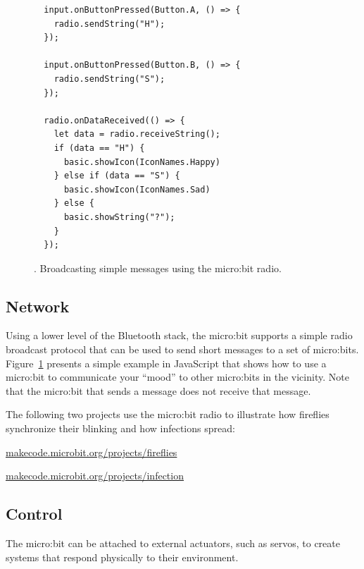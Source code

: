 \begin{figure}[t]
\begin{verbatim}
  input.onButtonPressed(Button.A, () => {
    radio.sendString("H");
  });

  input.onButtonPressed(Button.B, () => {
    radio.sendString("S");
  });

  radio.onDataReceived(() => {
    let data = radio.receiveString();
    if (data == "H") {
      basic.showIcon(IconNames.Happy)
    } else if (data == "S") {
      basic.showIcon(IconNames.Sad)
    } else {
      basic.showString("?");
    }
  });
\end{verbatim}
\caption{\label{fig:mood}. Broadcasting simple messages using the micro:bit radio.}
\end{figure}

\subsection{Network}

Using a lower level of the Bluetooth stack, the micro:bit supports 
a simple radio broadcast protocol that can be used to send short messages
to a set of micro:bits. Figure~\ref{fig:mood} presents a simple example 
in JavaScript that shows how to use a micro:bit to communicate your 
``mood'' to other micro:bits in the vicinity.
Note that the micro:bit that sends a message does not
receive that message. 

The following two projects use the micro:bit radio to illustrate
how fireflies synchronize their blinking and how infections spread:
\begin{center}    
    \small{\url{makecode.microbit.org/projects/fireflies}}
\end{center}
\begin{center}    
    \small{\url{makecode.microbit.org/projects/infection}}
\end{center}

\subsection{Control}

The micro:bit can be attached to external actuators, such as servos,
to create systems that respond physically to their environment. 



